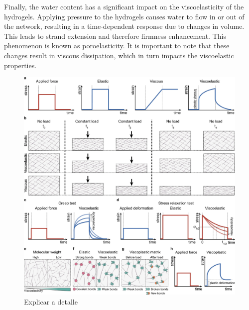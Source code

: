 Finally, the water content has a significant impact on the viscoelasticity of the hydrogels.
Applying pressure to the hydrogels causes water to flow in or out of the network, resulting in a time-dependent response due to changes in volume. This leads to strand extension and therefore firmness enhancement.
This phenomenon is known as poroelasticity. 
It is important to note that these changes result in viscous dissipation, which in turn impacts the viscoelastic properties\citep{sheikoArchitecturalCodeRubber2019,courbotRoleExtracellularMatrix2025}.


\begin{figure}[ht!]
    \centering
    \centering
    \includegraphics[width=\textwidth]{figs/mechResponse/0.png}
    \caption{Explicar a detalle\citep{courbotRoleExtracellularMatrix2025}}\label{fig:mechresponse0}
\end{figure}

